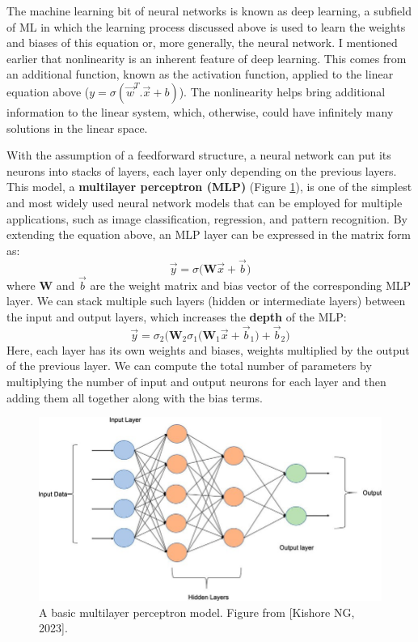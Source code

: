 The machine learning bit of neural networks is known as deep learning, a subfield of ML in which the learning process discussed above is used to learn the weights and biases of this equation or, more generally, the neural network. I mentioned earlier that nonlinearity is an inherent feature of deep learning. This comes from an additional function, known as the activation function, applied to the linear equation above ($y = \sigma(\vec{w} ^T. \vec{x} + b)$). The nonlinearity helps bring additional information to the linear system, which, otherwise, could have infinitely many solutions in the linear space.


With the assumption of a feedforward structure, a neural network can put its neurons into stacks of layers, each layer only depending on the previous layers. This model, a \textbf{multilayer perceptron (\gls{MLP})} (Figure \ref{fig:mlp}), is one of the simplest and most widely used neural network models that can be employed for multiple applications, such as image classification, regression, and pattern recognition. By extending the equation above, an MLP layer can be expressed in the matrix form as:
\begin{equation}
\vec{y} = \sigma \biggl(\mathbf{W}\vec{x} + \vec{b} \biggr)
\end{equation}
where $\mathbf{W}$ and $\vec{b}$ are the weight matrix and bias vector of the corresponding MLP layer. We can stack multiple such layers (hidden or intermediate layers) between the input and output layers, which increases the \textbf{depth} of the MLP:
\begin{equation}
\vec{y} = \sigma_2 \biggl( \mathbf{W}_2\sigma_1 \biggl(\mathbf{W}_1\vec{x} + \vec{b}_1 \biggr) + \vec{b}_2\biggr) 
\end{equation}
Here, each layer has its own weights and biases, weights multiplied by the output of the previous layer. We can compute the total number of parameters by multiplying the number of input and output neurons for each layer and then adding them all together along with the bias terms. 



\begin{figure}[ht]
  \centering
   \includegraphics[width=0.8\linewidth]{Images/MLP.jpeg}
   \caption{A basic multilayer perceptron model. Figure from [Kishore NG, 2023].}
   \label{fig:mlp}
\end{figure}

